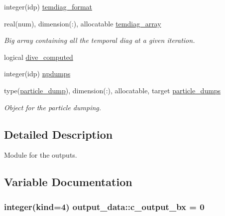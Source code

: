 \begin{DoxyCompactItemize}
\item 
integer(idp) \hyperlink{namespaceoutput__data_a2f4ce5fdd4011f5db5c6b9de97cf133a}{temdiag\+\_\+format}
\item 
real(num), dimension(\+:), allocatable \hyperlink{namespaceoutput__data_a034b19d2c3a5211b1fd96df24cd28dd1}{temdiag\+\_\+array}
\begin{DoxyCompactList}\small\item\em Big array containing all the temporal diag at a given iteration. \end{DoxyCompactList}\item 
logical \hyperlink{namespaceoutput__data_abc6cc1ed098892996b0f0dd858e410d1}{dive\+\_\+computed}
\item 
integer(idp) \hyperlink{namespaceoutput__data_a4dbfde333a6a2225527c27d33472032e}{npdumps}
\item 
type(\hyperlink{structoutput__data_1_1particle__dump}{particle\+\_\+dump}), dimension(\+:), allocatable, target \hyperlink{namespaceoutput__data_a5fbbbcc739158cb15a4a02aa8bc63399}{particle\+\_\+dumps}
\begin{DoxyCompactList}\small\item\em Object for the particle dumping. \end{DoxyCompactList}\end{DoxyCompactItemize}


\subsection{Detailed Description}
Module for the outputs. 

\subsection{Variable Documentation}
\subsubsection[{\texorpdfstring{c\+\_\+output\+\_\+bx}{c_output_bx}}]{\setlength{\rightskip}{0pt plus 5cm}integer(kind=4) output\+\_\+data\+::c\+\_\+output\+\_\+bx = 0}\hypertarget{namespaceoutput__data_a5f179944d21e0cf92d3dc54e5ff559f6}{}\label{namespaceoutput__data_a5f179944d21e0cf92d3dc54e5ff559f6}
